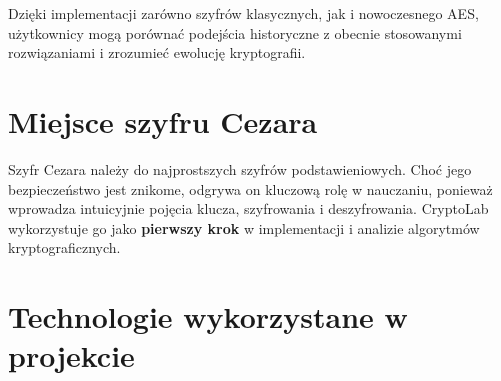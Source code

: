 \documentclass[12pt,a4paper]{article}
\begin{document}
Dzięki implementacji zarówno szyfrów klasycznych, jak i nowoczesnego AES, 
użytkownicy mogą porównać podejścia historyczne z obecnie stosowanymi rozwiązaniami 
i zrozumieć ewolucję kryptografii.

\section{Miejsce szyfru Cezara}
Szyfr Cezara należy do najprostszych szyfrów podstawieniowych. 
Choć jego bezpieczeństwo jest znikome, odgrywa on kluczową rolę w nauczaniu, 
ponieważ wprowadza intuicyjnie pojęcia klucza, szyfrowania i deszyfrowania. 
CryptoLab wykorzystuje go jako \textbf{pierwszy krok} w implementacji i analizie algorytmów kryptograficznych.


\section{Technologie wykorzystane w projekcie}
\end{document}
